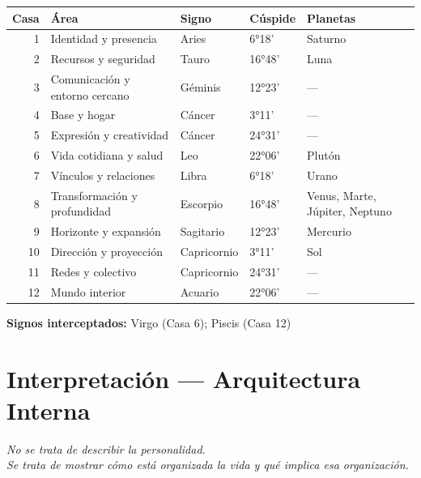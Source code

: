 \documentclass[11pt,a4paper]{article}
\begin{document}
\begin{center}
\begin{tabular}{rllll}
  \toprule
  \textbf{Casa} & \textbf{Área} & \textbf{Signo} & \textbf{Cúspide} & \textbf{Planetas} \\
  \midrule
  1 & Identidad y presencia & Aries & 6°18' & Saturno \\
  2 & Recursos y seguridad & Tauro & 16°48' & Luna \\
  3 & Comunicación y entorno cercano & Géminis & 12°23' & — \\
  4 & Base y hogar & Cáncer & 3°11' & — \\
  5 & Expresión y creatividad & Cáncer & 24°31' & — \\
  6 & Vida cotidiana y salud & Leo & 22°06' & Plutón \\
  7 & Vínculos y relaciones & Libra & 6°18' & Urano \\
  8 & Transformación y profundidad & Escorpio & 16°48' & Venus, Marte, Júpiter, Neptuno \\
  9 & Horizonte y expansión & Sagitario & 12°23' & Mercurio \\
  10 & Dirección y proyección & Capricornio & 3°11' & Sol \\
  11 & Redes y colectivo & Capricornio & 24°31' & — \\
  12 & Mundo interior & Acuario & 22°06' & — \\
  \bottomrule
\end{tabular}
\end{center}

\vspace{0.3cm}\textbf{Signos interceptados:} Virgo (Casa 6); Piscis (Casa 12)

\newpage

\section{Interpretación — Arquitectura Interna}

\begin{center}
{\small\itshape
No se trata de describir la personalidad.\\ Se trata de mostrar cómo está organizada la vida y qué implica esa organización.
}
\end{center}

\vspace{0.5cm}
\end{document}
